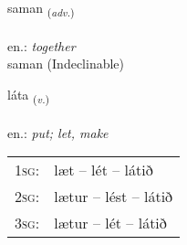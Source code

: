 \documentclass[frontgrid, backgrid]{flacards}\usepackage[]{graphicx}\usepackage[]{xcolor}
\begin{document}
\renewcommand{\flhead}{\vskip5pt \fboxsep=0pt {\small\bfseries\footnotesize Atviksorð | Adverb}}
\renewcommand{\fcfoot}{\vskip5pt \fboxsep=0pt \hspace{2pt}{\small\bfseries\footnotesize 1K}}

\renewcommand{\blhead}{\vskip5pt {\small\bfseries\footnotesize Atviksorð | Adverb }}
\renewcommand{\bcfoot}{\vskip5pt \hspace{2pt}{\small\bfseries\footnotesize 1K}}


{saman \small{\textsubscript{(\textit{adv.})}} \\[1ex]
\textphonetic{[saːman]} \\
en.: \emph{together} \\  [2ex]
saman (Indeclinable)}

\renewcommand{\flhead}{\vskip5pt \fboxsep=0pt {\small\bfseries\footnotesize Sagnorð | Verb}}
\renewcommand{\fcfoot}{\vskip5pt \fboxsep=0pt \hspace{2pt}{\small\bfseries\footnotesize 1K}}

\renewcommand{\blhead}{\vskip5pt {\small\bfseries\footnotesize Sagnorð | Verb }}
\renewcommand{\bcfoot}{\vskip5pt \hspace{2pt}{\small\bfseries\footnotesize 1K}}


{láta \small{\textsubscript{(\textit{v.})}} \\[1ex] %
\textphonetic{[lauːta]} \\
en.: \emph{put; let, make} \\  [2ex]
\renewcommand*{\arraystretch}{0.8}
\begin{tabular}{p{1cm}l}
\textsc{1sg}: & læt -- lét -- látið \\ 
\textsc{2sg}: & lætur -- lést -- látið \\ 
\textsc{3sg}: & lætur -- lét -- látið \\ 
\end{tabular}
}


\renewcommand{\flhead}{\vskip5pt \fboxsep=0pt {\small\bfseries\footnotesize Forsetning | Preposition}}
\renewcommand{\fcfoot}{\vskip5pt \fboxsep=0pt \hspace{2pt}{\small\bfseries\footnotesize 1K}}
\end{document}
